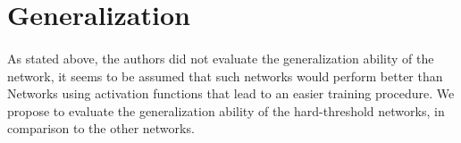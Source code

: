 \section{Generalization}
\paragraph{}
As stated above, the authors did not evaluate the generalization ability of the network, it seems to be assumed that such networks would perform better than Networks using activation functions that lead to an easier training procedure. We propose to evaluate the generalization ability of the hard-threshold networks, in comparison to the other networks.